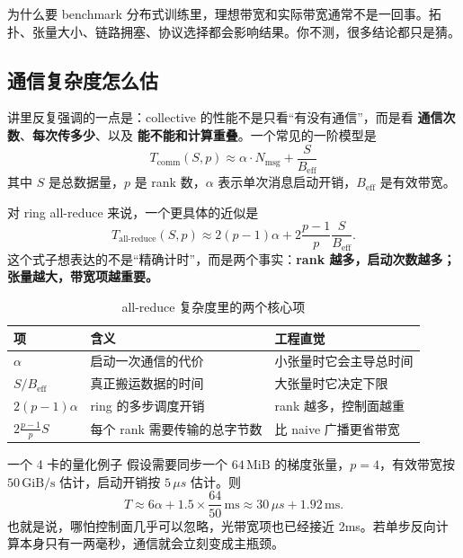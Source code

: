 \documentclass[a4paper]{article}
\begin{document}
\begin{knowledgebox}{为什么要 benchmark}
分布式训练里，理想带宽和实际带宽通常不是一回事。拓扑、张量大小、链路拥塞、协议选择都会影响结果。你不测，很多结论都只是猜。
\end{knowledgebox}

\subsection{通信复杂度怎么估}

讲里反复强调的一点是：collective 的性能不是只看“有没有通信”，而是看 \textbf{通信次数}、\textbf{每次传多少}、以及 \textbf{能不能和计算重叠}。一个常见的一阶模型是
\[
T_{\text{comm}}(S, p) \approx \alpha \cdot N_{\text{msg}} + \frac{S}{B_{\text{eff}}}
\]
其中 $S$ 是总数据量，$p$ 是 rank 数，$\alpha$ 表示单次消息启动开销，$B_{\text{eff}}$ 是有效带宽。

对 ring all-reduce 来说，一个更具体的近似是
\[
T_{\text{all-reduce}}(S, p) \approx 2(p-1)\alpha + 2\frac{p-1}{p}\frac{S}{B_{\text{eff}}}.
\]
这个式子想表达的不是“精确计时”，而是两个事实：\textbf{rank 越多，启动次数越多；张量越大，带宽项越重要。}

\begin{table}[H]
\centering
\small
\begin{tabular}{p{3.2cm}p{4.3cm}p{4.3cm}}
\toprule
\textbf{项} & \textbf{含义} & \textbf{工程直觉} \\
\midrule
$\alpha$ & 启动一次通信的代价 & 小张量时它会主导总时间 \\
$S / B_{\text{eff}}$ & 真正搬运数据的时间 & 大张量时它决定下限 \\
$2(p-1)\alpha$ & ring 的多步调度开销 & rank 越多，控制面越重 \\
$2\frac{p-1}{p}S$ & 每个 rank 需要传输的总字节数 & 比 naive 广播更省带宽 \\
\bottomrule
\end{tabular}
\caption{all-reduce 复杂度里的两个核心项}
\end{table}

\begin{knowledgebox}{一个 4 卡的量化例子}
假设需要同步一个 $64\,\text{MiB}$ 的梯度张量，$p=4$，有效带宽按 $50\,\text{GiB/s}$ 估计，启动开销按 $5\,\mu s$ 估计。则
\[
T \approx 6\alpha + 1.5\times \frac{64}{50}\,\text{ms} \approx 30\,\mu s + 1.92\,\text{ms}.
\]
也就是说，哪怕控制面几乎可以忽略，光带宽项也已经接近 2ms。若单步反向计算本身只有一两毫秒，通信就会立刻变成主瓶颈。
\end{knowledgebox}
\end{document}
